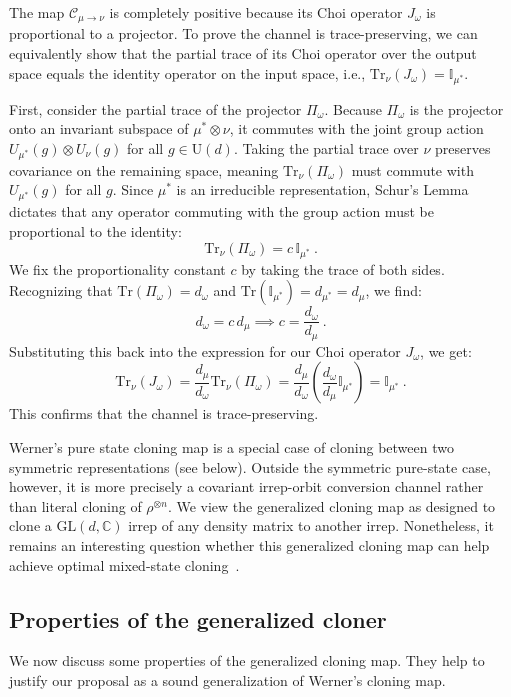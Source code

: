 \documentclass[a4paper,onecolumn,11pt]{quantumarticle}
\def\id{\mathbb{I}}
\newcommand*{\Tr}{\mathrm{Tr}}
\begin{document}
The map $\mathcal{C}_{\mu\to\nu}$ is completely positive because its Choi operator $J_\omega$ is proportional to a projector. To prove the channel is trace-preserving, we can equivalently show that the partial trace of its Choi operator over the output space equals the identity operator on the input space, i.e., $\Tr_\nu(J_\omega) = \id_{\mu^*}$.

First, consider the partial trace of the projector $\Pi_\omega$. Because $\Pi_\omega$ is the projector onto an invariant subspace of $\mu^* \otimes \nu$, it commutes with the joint group action $U_{\mu^*}(g) \otimes U_\nu(g)$ for all $g \in \mathrm{U}(d)$. Taking the partial trace over $\nu$ preserves covariance on the remaining space, meaning $\Tr_\nu(\Pi_\omega)$ must commute with $U_{\mu^*}(g)$ for all $g$. Since $\mu^*$ is an irreducible representation, Schur's Lemma dictates that any operator commuting with the group action must be proportional to the identity:
\[
    \Tr_\nu(\Pi_\omega) = c\, \id_{\mu^*}\ .
\]
We fix the proportionality constant $c$ by taking the trace of both sides. Recognizing that $\Tr(\Pi_\omega) = d_\omega$ and $\Tr(\id_{\mu^*}) = d_{\mu^*} = d_\mu$, we find:
\[
    d_\omega = c\, d_\mu \implies c = \frac{d_\omega}{d_\mu}\ .
\]
Substituting this back into the expression for our Choi operator $J_\omega$, we get:
\[
    \Tr_\nu(J_\omega) = \frac{d_\mu}{d_\omega} \Tr_\nu(\Pi_\omega) = \frac{d_\mu}{d_\omega} \left( \frac{d_\omega}{d_\mu} \id_{\mu^*} \right) = \id_{\mu^*}\ .
\]
This confirms that the channel is trace-preserving.

Werner's pure state cloning map is a special case of cloning between two symmetric representations (see below). Outside the symmetric pure-state case, however, it is more precisely a covariant irrep-orbit conversion channel rather than literal cloning of $\rho^{\otimes n}$. We view the generalized cloning map as designed to clone a $\mathrm{GL}(d,\mathbb C)$ irrep of any density matrix to another irrep. Nonetheless, it remains an interesting question whether this generalized cloning map can help achieve optimal mixed-state cloning~\cite{scarani2005quantum}. 

\subsection{Properties of the generalized cloner}\label{sec:properties}
We now discuss some properties of the generalized cloning map. They help to justify our proposal as a sound generalization of Werner's cloning map.
\end{document}
